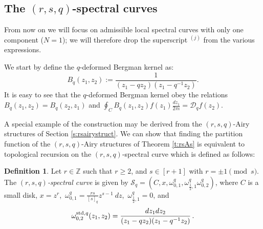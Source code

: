 \documentclass[reqno,11pt]{amsart}
\theoremstyle{plain}
\theoremstyle{definition}
\newtheorem{definition}[theorem]{Definition}
\theoremstyle{remark}
\numberwithin{equation}{section}
\newcommand{\1}{\mathds{1}}
\newcommand{\2}{\frac{1}{2}}
\begin{document}
{				\subsection{The $(r,s,q)$-spectral curves}
				From now on we will focus on admissible local spectral curves with only one component ($N=1$); we will therefore drop the superscript $^{(j)}$ from the various expressions.
				
				{We start by define the $q$-deformed Bergman kernel as:
					\begin{equation}\label{qB}
						B_q(z_1,z_2):= \frac{1}{(z_1 - qz_2)(z_1 - q^{-1}z_2)}.
					\end{equation} It is easy to see that the $q$-deformed Bergman kernel obey the relations $B_q(z_1,z_2)=B_q(z_2,z_1)$ and $
					\oint_C B_q(z_1,z_2) f(z_1) \frac{dz_1}{2\pi i} =  \mathcal{D}_q f(z_2)$.}
				
				{A special example of the construction may be derived from the $(r,s,q)$-Airy structures of Section \ref{s:rsairystruct}. We can show that finding the partition function of the $(r,s,q)$-Airy structures of Theorem \ref{t:rsAs} is equivalent to topological recursion on the $(r,s,q)$-spectral curve which is defined as follows:}
				\begin{definition}\label{d:rs}
					Let $r  \in \mathbb{Z}$ such that $r \geq 2$, and $s \in [r+1]$ with $r = \pm 1 \pmod{s}$.
					The \emph{$(r,s,q)$-spectral curve} is given by $\mathcal{S}_q = (C, x, \omega^{q}_{0,1}, \omega^{q}_{\frac{1}{2},1} \omega^{q}_{0,2} ) $, where  $C$ is a small disk, $ x =  z^r$,\, $\omega^{q}_{0,1} = \frac{rs}{[s]_q} z^{s-1}\ dz$,\, $\omega^{q}_{\frac{1}{2},1} = 0$, and
					{\begin{equation}
							\omega^{\textup{std},q}_{0,2}(z_1, z_2)= \frac{dz_1 dz_2}{(z_1 - qz_2)(z_1-q^{-1}z_2)}\,.
					\end{equation}}
				\end{definition}
				
}
\end{document}
